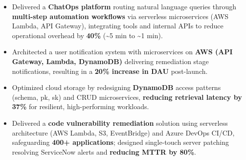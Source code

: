 \documentclass[letterpaper,10.5pt]{extarticle}
\begin{document}
\begin{itemize}[leftmargin=12pt, topsep=1pt, itemsep=0pt, parsep=0pt]
    \item Delivered a \textbf{ChatOps platform} routing natural language queries through \textbf{multi-step automation workflows} via serverless microservices (AWS Lambda, API Gateway), integrating tools and internal APIs to reduce operational overhead by \textbf{40\%} (\textasciitilde5 min to \textasciitilde1 min).
    \item Architected a user notification system with microservices on \textbf{AWS (API Gateway, Lambda, DynamoDB)} delivering remediation stage notifications, resulting in a \textbf{20\% increase in DAU} post-launch.
    \item Optimized cloud storage by redesigning \textbf{DynamoDB} access patterns (schema, pk, sk) and CRUD microservices, \textbf{reducing retrieval latency by 37\%} for resilient, high-performing workloads.
    \item Delivered a \textbf{code vulnerability remediation} solution using serverless architecture (AWS Lambda, S3, EventBridge) and Azure DevOps CI/CD, safeguarding \textbf{400+ applications}; designed single-touch server patching resolving ServiceNow alerts and \textbf{reducing MTTR by 80\%}.
\end{itemize}
\end{document}
